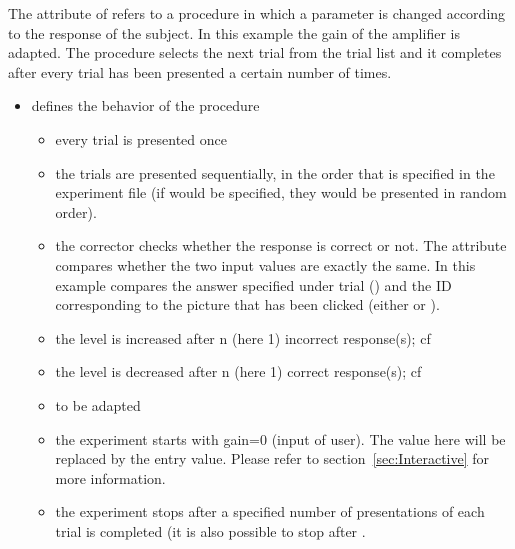The attribute  of
 refers to a procedure in which a parameter is
changed according to the response of the subject. In this example
the gain of the amplifier is adapted. The procedure selects the
next trial from the trial list and it completes after every trial
has been presented a certain number of times.

\begin{itemize}
\item {} defines the behavior of the procedure

\begin{itemize}

\item {} every trial is presented once

\item {} the trials are presented sequentially, in
the order that is specified in the experiment file (if
 would be specified, they would be presented in random
order).

\item {} the corrector checks whether the response is correct or not. The
attribute  compares whether the two
input values are exactly the same. In this example
 compares the answer specified under trial  () and
the ID corresponding to the picture that has been clicked (either  or ).

\item {} the level is increased after n (here 1)
incorrect response(s); cf 

\item {} the level is decreased after n (here 1)
correct response(s); cf 

\item {} to be adapted

\item {} the experiment starts with gain=0
(input of user). The value here will be replaced by the entry
value. Please refer to section~\ref{sec:Interactive} for more
information.

\item {} the experiment stops after a
specified number of presentations of each trial is completed (it
is also possible to stop after .


\end{itemize}
\end{itemize}
